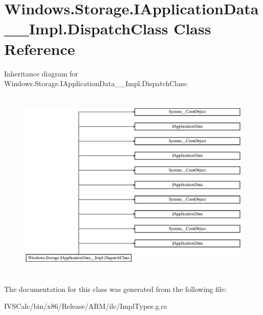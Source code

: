 \hypertarget{class_windows_1_1_storage_1_1_i_application_data_____impl_1_1_dispatch_class}{}\section{Windows.\+Storage.\+I\+Application\+Data\+\_\+\+\_\+\+Impl.\+Dispatch\+Class Class Reference}
\label{class_windows_1_1_storage_1_1_i_application_data_____impl_1_1_dispatch_class}
Inheritance diagram for Windows.\+Storage.\+I\+Application\+Data\+\_\+\+\_\+\+Impl.\+Dispatch\+Class\+:\begin{figure}[H]
\begin{center}
\leavevmode
\includegraphics[height=9.221557cm]{class_windows_1_1_storage_1_1_i_application_data_____impl_1_1_dispatch_class}
\end{center}
\end{figure}


The documentation for this class was generated from the following file\+:\begin{DoxyCompactItemize}
\item 
I\+V\+S\+Calc/bin/x86/\+Release/\+A\+R\+M/ilc/Impl\+Types.\+g.\+cs\end{DoxyCompactItemize}
